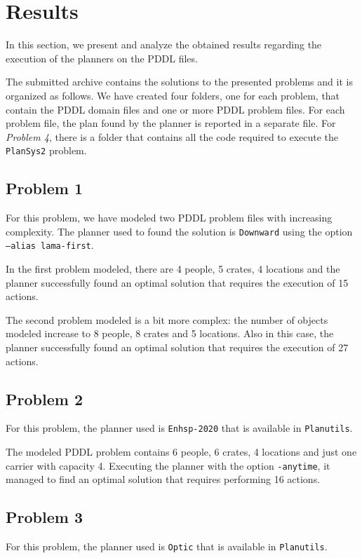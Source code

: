 \section{Results}
\label{sec4}
In this section, we present and analyze the obtained results regarding the execution of the planners on 
the PDDL files.

The submitted archive contains the solutions to the presented problems and it is organized as follows.
We have created four folders, one for each problem, that contain the PDDL domain files and one or more 
PDDL problem files. For each problem file, the plan found by the planner is reported in a separate file.
For \textit{Problem 4}, there is a folder that contains all the code required to execute the \texttt{PlanSys2} 
problem.


\subsection{Problem 1}
For this problem, we have modeled two PDDL problem files with increasing complexity.
The planner used to found the solution is \texttt{Downward} using the option \texttt{--alias lama-first}.

In the first problem modeled, there are 4 people, 5 crates, 4 locations and the planner successfully
found an optimal solution that requires the execution of 15 actions.

The second problem modeled is a bit more complex: the number of objects modeled increase to 8 people, 
8 crates and 5 locations. Also in this case, the planner successfully
found an optimal solution that requires the execution of 27 actions.


\subsection{Problem 2}
For this problem, the planner used is \texttt{Enhsp-2020} that is available in \texttt{Planutils}.

The modeled PDDL problem contains 6 people, 6 crates, 4 locations and just one carrier with capacity 4.
Executing the planner with the option \texttt{-anytime}, it managed to find an optimal solution that 
requires performing 16 actions.

\subsection{Problem 3}
For this problem, the planner used is \texttt{Optic} that is available in \texttt{Planutils}.

